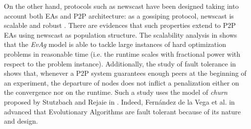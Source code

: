 On the other hand, protocols such as newscast have been designed taking
into account both EAs and P2P architecture: as a gossiping protocol, newscast is scalable and robust \cite{spyros:robustscalable}. There are evidences that such properties extend to P2P EAs using newscast as population structure. The scalability analysis in \cite{laredo08:large} shows that the \emph{EvAg} model is able to tackle large instances of hard optimization problems in reasonable time (i.e. the runtime scales with fractional power with respect to the problem instance). Additionally, the study of fault tolerance in \cite{laredo08:churn} shows that, whenever a P2P system guarantees enough peers at the beginning of an experiment, the departure of nodes 
does not inflict a penalization either on the convergence nor on the
runtime. Such a study uses the model of \emph{churn} proposed by
Stutzbach and Rejaie in \cite{Stutzbach06Understanding}. Indeed,
Fern\'andez de la Vega et al. in \cite{vega06:faulttolerance} advanced that
Evolutionary Algorithms are fault tolerant because of its nature and
design.  

